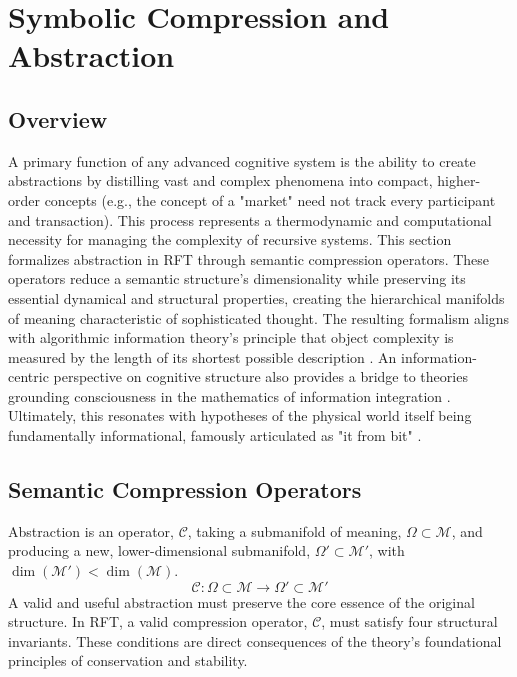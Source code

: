 \chapter{Symbolic Compression and Abstraction}

\section{Overview}

A primary function of any advanced cognitive system is the ability to create abstractions by distilling vast and complex phenomena into compact, higher-order concepts (e.g., the concept of a "market" need not track every participant and transaction). This process represents a thermodynamic and computational necessity for managing the complexity of recursive systems. This section formalizes abstraction in RFT through semantic compression operators. These operators reduce a semantic structure's dimensionality while preserving its essential dynamical and structural properties, creating the hierarchical manifolds of meaning characteristic of sophisticated thought. The resulting formalism aligns with algorithmic information theory's principle that object complexity is measured by the length of its shortest possible description \autocite{Kolmogorov1965, Chaitin1966}. An information-centric perspective on cognitive structure also provides a bridge to theories grounding consciousness in the mathematics of information integration \autocite{Tononi2004}. Ultimately, this resonates with hypotheses of the physical world itself being fundamentally informational, famously articulated as "it from bit" \autocite{Wheeler1990}.

\section{Semantic Compression Operators}

Abstraction is an operator, \(\mathcal{C}\), taking a submanifold of meaning, \(\Omega \subset \mathcal{M}\), and producing a new, lower-dimensional submanifold, \(\Omega' \subset \mathcal{M}'\), with \(\dim(\mathcal{M}') < \dim(\mathcal{M})\).
\begin{equation}
\mathcal{C}: \Omega \subset \mathcal{M} \longrightarrow \Omega' \subset \mathcal{M}'
\end{equation}
A valid and useful abstraction must preserve the core essence of the original structure. In RFT, a valid compression operator, \(\mathcal{C}\), must satisfy four structural invariants. These conditions are direct consequences of the theory's foundational principles of conservation and stability.

